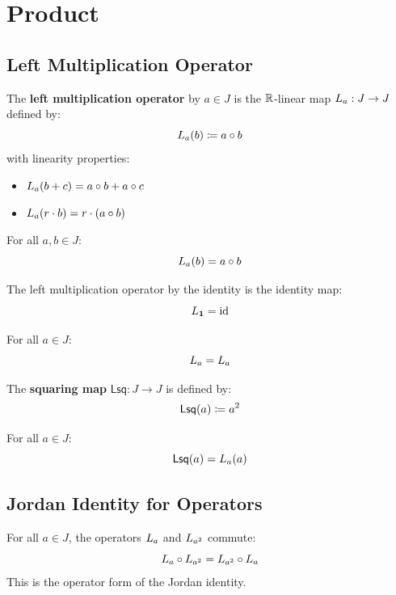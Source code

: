 \section{Product}

\subsection{Left Multiplication Operator}

\begin{definition}[L]
The \textbf{left multiplication operator} by $a \in J$ is the $\mathbb{R}$-linear map $L_{a} : J \to J$ defined by:
\[ L_{a}(b) \coloneqq a \circ b \]
with linearity properties:
\begin{itemize}
  \item $L_{a}(b + c) = a \circ b + a \circ c$
  \item $L_{a}(r \cdot b) = r \cdot (a \circ b)$
\end{itemize}
\end{definition}

\begin{lemma}[L\_apply]
For all $a, b \in J$:
\[ L_{a}(b) = a \circ b \]
\end{lemma}

\begin{theorem}[L\_one]
The left multiplication operator by the identity is the identity map:
\[ L_{\mathbf{1}} = \mathrm{id} \]
\end{theorem}

\begin{lemma}[L\_comm]
For all $a \in J$:
\[ L_{a} = L_{a} \]
\end{lemma}

\begin{definition}[Lsq]
The \textbf{squaring map} $\mathsf{Lsq} : J \to J$ is defined by:
\[ \mathsf{Lsq}(a) \coloneqq a^{2} \]
\end{definition}

\begin{lemma}
For all $a \in J$:
\[ \mathsf{Lsq}(a) = L_{a}(a) \]
\end{lemma}

\subsection{Jordan Identity for Operators}

\begin{theorem}[L\_comm\_L\_sq]
For all $a \in J$, the operators $L_{a}$ and $L_{a^{2}}$ commute:
\[ L_{a} \circ L_{a^{2}} = L_{a^{2}} \circ L_{a} \]
This is the operator form of the Jordan identity.
\end{theorem}

